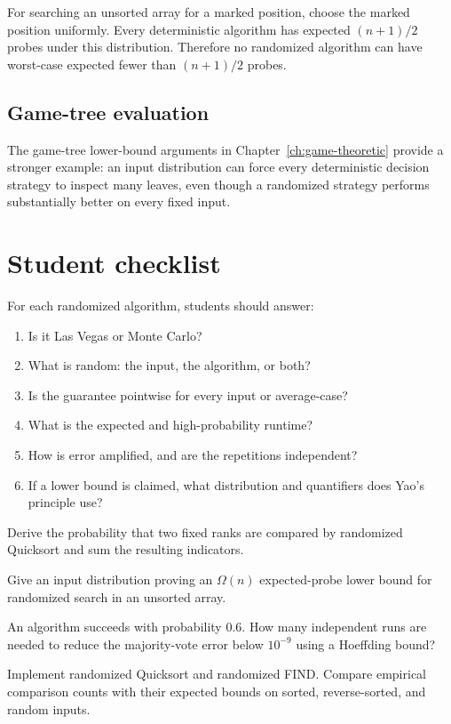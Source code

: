 For searching an unsorted array for a marked position, choose the marked
position uniformly.  Every deterministic algorithm has expected
$(n+1)/2$ probes under this distribution.  Therefore no randomized algorithm
can have worst-case expected fewer than $(n+1)/2$ probes.

\subsection{Game-tree evaluation}

The game-tree lower-bound arguments in Chapter~\ref{ch:game-theoretic}
provide a stronger example: an input distribution can force every
deterministic decision strategy to inspect many leaves, even though a
randomized strategy performs substantially better on every fixed input.

\section{Student checklist}

For each randomized algorithm, students should answer:

\begin{enumerate}
\item Is it Las Vegas or Monte Carlo?
\item What is random: the input, the algorithm, or both?
\item Is the guarantee pointwise for every input or average-case?
\item What is the expected and high-probability runtime?
\item How is error amplified, and are the repetitions independent?
\item If a lower bound is claimed, what distribution and quantifiers does
      Yao's principle use?
\end{enumerate}

\begin{problem}
Derive the probability that two fixed ranks are compared by randomized
Quicksort and sum the resulting indicators.
\end{problem}

\begin{problem}
Give an input distribution proving an $\Omega(n)$ expected-probe lower bound
for randomized search in an unsorted array.
\end{problem}

\begin{problem}[Amplification]
An algorithm succeeds with probability $0.6$.  How many independent runs are
needed to reduce the majority-vote error below $10^{-9}$ using a Hoeffding
bound?
\end{problem}

\begin{problem}[Implementation]
Implement randomized Quicksort and randomized FIND.  Compare empirical
comparison counts with their expected bounds on sorted, reverse-sorted, and
random inputs.
\end{problem}
